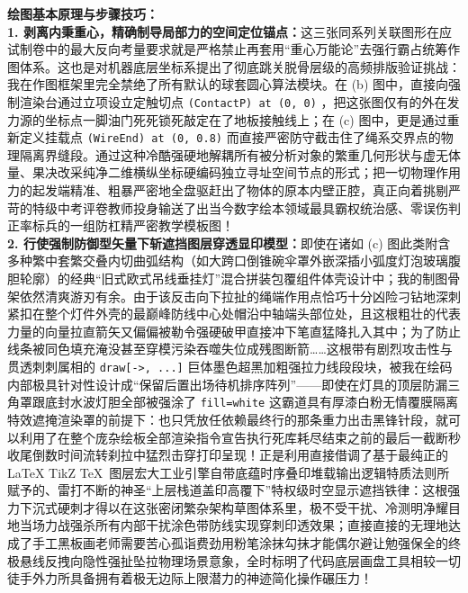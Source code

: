 \vspace{0.6cm}

{\small\color{blue!70!black}
\textbf{绘图基本原理与步骤技巧：}\\
\textbf{1. 剥离内秉重心，精确制导局部力的空间定位锚点：}这三张同系列关联图形在应试制卷中的最大反向考量要求就是严格禁止再套用“重心万能论”去强行霸占统筹作图体系。这也是对机器底层坐标系提出了彻底跳关脱骨层级的高频排版验证挑战：我在作图框架里完全禁绝了所有默认的球套圆心算法模块。在 (b) 图中，直接向强制渲染台通过立项设立定触切点 \texttt{(ContactP) at (0, 0)} ，把这张图仅有的外在发力源的坐标点一脚油门死死锁死敲定在了地板接触线上；在 (c) 图中，更是通过重新定义挂载点 \texttt{(WireEnd) at (0, 0.8)} 而直接严密防守截击住了绳系交界点的物理隔离界缝段。通过这种冷酷强硬地解耦所有被分析对象的繁重几何形状与虚无体量、果决改采纯净二维横纵坐标硬编码独立寻址空间节点的形式；把一切物理作用力的起发端精准、粗暴严密地全盘驱赶出了物体的原本内壁正腔，真正向着挑剔严苛的特级中考评卷教师投身输送了出当今数字绘本领域最具霸权统治感、零误伤判正率标兵的一组防杠精严密教学模板图！\\
\textbf{2. 行使强制防御型矢量下斩遮挡图层穿透显印模型：}即使在诸如 (c) 图此类附含多种繁中套繁交叠内切曲弧结构（如大跨口倒锥碗伞罩外嵌深插小弧度灯泡玻璃腹胆轮廓）的经典“旧式欧式吊线垂挂灯”混合拼装包覆组件体壳设计中；我的制图骨架依然清爽游刃有余。由于该反击向下拉扯的绳端作用点恰巧十分凶险刁钻地深刺紧扣在整个灯件外壳的最巅峰防线中心处帽沿中轴端头部位处，且这根粗壮的代表力量的向量拉直箭矢又偏偏被勒令强硬破甲直接冲下笔直猛降扎入其中；为了防止线条被同色填充淹没甚至穿模污染吞噬失位成残图断箭……这根带有剧烈攻击性与贯透刺刺属相的 \texttt{draw[->, ...]} 巨体墨色超黑加粗强拉力线段段块，被我在绘码内部极具针对性设计成“保留后置出场待机排序阵列”——即使在灯具的顶层防漏三角罩跟底封水波灯胆全部被强涂了 \texttt{fill=white} 这霸道具有厚漆白粉无情覆膜隔离特效遮掩渲染罩的前提下：也只凭放任依赖最终行的那条重力出击黑锋针段，就可以利用了在整个庞杂绘板全部渲染指令宣告执行死库耗尽结束之前的最后一截断秒收尾倒数时间流转刹拉中猛烈击穿打印呈现！正是利用直接借调了基于最纯正的 LaTeX TikZ \TeX\ 图层宏大工业引擎自带底蕴时序叠印堆载输出逻辑特质法则所赋予的、雷打不断的神圣“上层栈道盖印高覆下”特权级时空显示遮挡铁律：这根强力下沉式硬刺才得以在这张密闭繁杂架构草图体系里，极不受干扰、冷测明净耀目地当场力战强杀所有内部干扰涂色带防线实现穿刺印透效果；直接直接的无理地达成了手工黑板画老师需要苦心孤诣费劲用粉笔涂抹勾抹才能偶尔避让勉强保全的终极悬线反拽向隐性强扯坠拉物理场景意象，全时标明了代码底层画盘工具相较一切徒手外力所具备拥有着极无边际上限潜力的神迹简化操作碾压力！
}



